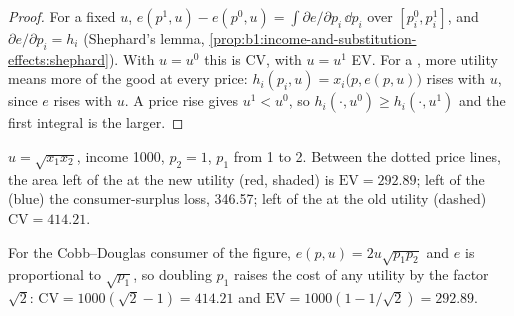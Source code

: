 \begin{proof}
For a fixed $u$, $e(p^1, u) - e(p^0, u) = \int \partial e/\partial p_i\,\dd p_i$
over $[p_i^0, p_i^1]$, and $\partial e/\partial p_i = h_i$ (Shephard's lemma,
\cref{prop:b1:income-and-substitution-effects:shephard}). With $u = u^0$ this is
CV, with $u = u^1$ EV. For a , more utility means more of the good
at every price: $h_i(p_i, u) = x_i\bigl(p, e(p, u)\bigr)$ rises with $u$, since $e$
rises with $u$. A price rise gives $u^1 < u^0$, so $h_i(\cdot, u^0) \ge h_i(\cdot, u^1)$
and the first integral is the larger.
\end{proof}

\begin{omfigure}

{\small $u = \sqrt{x_1x_2}$, income 1000, $p_2 = 1$, $p_1$ from 1 to 2. Between the
dotted price lines, the area left of the  at the new
utility (red, shaded) is $\mathrm{EV} = 292.89$; left of the 
(blue) the consumer-surplus loss, 346.57; left of the  at
the old utility (dashed) $\mathrm{CV} = 414.21$.}
\end{omfigure}

For the Cobb--Douglas consumer of the figure, $e(p, u) = 2u\sqrt{p_1p_2}$ and
$e$ is proportional to $\sqrt{p_1}$, so doubling $p_1$ raises the cost of any
utility by the factor $\sqrt 2$:
$\mathrm{CV} = 1000(\sqrt 2 - 1) = 414.21$ and
$\mathrm{EV} = 1000(1 - 1/\sqrt 2) = 292.89$.

